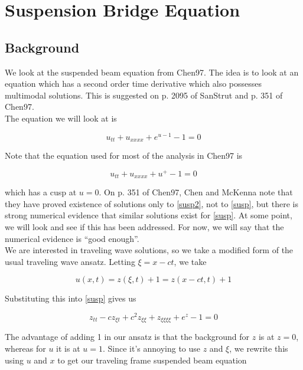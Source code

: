 \documentclass[12pt]{article}
\begin{document}
\section{Suspension Bridge Equation}

\subsection{Background}

We look at the suspended beam equation from Chen97. The idea is to look at an equation which has a second order time derivative which also possesses multimodal solutions. This is suggested on p. 2095 of SanStrut and p. 351 of Chen97.\\

The equation we will look at is

\begin{equation}\label{susp}
u_{tt} + u_{xxxx} + e^{u - 1} - 1 = 0
\end{equation}

Note that the equation used for most of the analysis in Chen97 is 

\begin{equation}\label{susp2}
u_{tt} + u_{xxxx} + u^+ - 1 = 0
\end{equation}

which has a cusp at $u = 0$. On p. 351 of Chen97, Chen and McKenna note that they have proved existence of solutions only to \eqref{susp2}, not to \eqref{susp}, but there is strong numerical evidence that similar solutions exist for \eqref{susp}. At some point, we will look and see if this has been addressed. For now, we will say that the numerical evidence is ``good enough''.\\

We are interested in traveling wave solutions, so we take a modified form of the usual traveling wave ansatz. Letting $\xi = x - ct$, we take

\begin{equation}
u(x, t) = z(\xi, t) + 1 = z(x - ct, t) + 1
\end{equation}

Substituting this into \eqref{susp} gives us

\begin{equation*}
z_{tt} - c z_{\xi t} + c^2 z_{\xi \xi} + z_{\xi \xi \xi \xi} + e^{z} - 1 = 0
\end{equation*}

The advantage of adding 1 in our ansatz is that the background for $z$ is at $z = 0$, whereas for $u$ it is at $u = 1$. Since it's annoying to use $z$ and $\xi$, we rewrite this using $u$ and $x$ to get our traveling frame suspended beam equation
\end{document}
